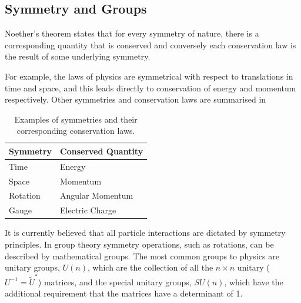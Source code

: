 \subsection{Symmetry and Groups}
\label{sec:symmetry}
Noether's theorem states that for every symmetry of nature, there is
a corresponding quantity that is conserved and conversely each conservation law
is the result of some underlying symmetry.

For example, the laws of physics are symmetrical with respect to translations in
time and space, and this leads directly to conservation of energy and momentum
respectively. Other symmetries and conservation laws are summarised in

\begin{table}
\begin{center}
\begin{tabular}{ l l }
Symmetry & Conserved Quantity \\ \hline
Time     & Energy \\
Space    & Momentum \\
Rotation & Angular Momentum \\
Gauge    & Electric Charge \\
\end{tabular}
\caption{Examples of symmetries and their corresponding conservation laws.
\label{tab:symmetry}}
\end{center}
\end{table}

It is currently believed that all particle interactions are dictated by symmetry
principles.  In group theory symmetry operations, such as rotations, can be
described by mathematical groups.
The most common groups to physics are unitary groups, $U(n)$, which are the
collection of all the $n\times n$ unitary ($U^{-1} = \tilde{U}^{*}$) matrices, and
the special unitary groups, $SU(n)$, which have the additional requirement that
the matrices have a determinant of 1.

